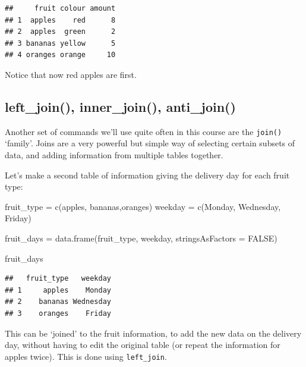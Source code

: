 \documentclass[
]{book}
\newenvironment{Shaded}{\begin{snugshade}}{\end{snugshade}}
\newcommand{\AttributeTok}[1]{\textcolor[rgb]{0.77,0.63,0.00}{#1}}
\newcommand{\ConstantTok}[1]{\textcolor[rgb]{0.00,0.00,0.00}{#1}}
\newcommand{\FunctionTok}[1]{\textcolor[rgb]{0.00,0.00,0.00}{#1}}
\newcommand{\NormalTok}[1]{#1}
\newcommand{\OtherTok}[1]{\textcolor[rgb]{0.56,0.35,0.01}{#1}}
\newcommand{\StringTok}[1]{\textcolor[rgb]{0.31,0.60,0.02}{#1}}
\begin{document}
\begin{verbatim}
##     fruit colour amount
## 1  apples    red      8
## 2  apples  green      2
## 3 bananas yellow      5
## 4 oranges orange     10
\end{verbatim}

Notice that now red apples are first.

\hypertarget{left_join-inner_join-anti_join}{%
\subsection{left\_join(), inner\_join(), anti\_join()}\label{left_join-inner_join-anti_join}}

Another set of commands we'll use quite often in this course are the \texttt{join()} `family'. Joins are a very powerful but simple way of selecting certain subsets of data, and adding information from multiple tables together.

Let's make a second table of information giving the delivery day for each fruit type:

\begin{Shaded}
\begin{Highlighting}[]
\NormalTok{fruit\_type }\OtherTok{=} \FunctionTok{c}\NormalTok{(}\StringTok{\textquotesingle{}apples\textquotesingle{}}\NormalTok{, }\StringTok{\textquotesingle{}bananas\textquotesingle{}}\NormalTok{,}\StringTok{\textquotesingle{}oranges\textquotesingle{}}\NormalTok{)}
\NormalTok{weekday }\OtherTok{=} \FunctionTok{c}\NormalTok{(}\StringTok{\textquotesingle{}Monday\textquotesingle{}}\NormalTok{, }\StringTok{\textquotesingle{}Wednesday\textquotesingle{}}\NormalTok{, }\StringTok{\textquotesingle{}Friday\textquotesingle{}}\NormalTok{)}

\NormalTok{fruit\_days }\OtherTok{=} \FunctionTok{data.frame}\NormalTok{(fruit\_type, weekday, }\AttributeTok{stringsAsFactors =} \ConstantTok{FALSE}\NormalTok{)}

\NormalTok{fruit\_days}
\end{Highlighting}
\end{Shaded}

\begin{verbatim}
##   fruit_type   weekday
## 1     apples    Monday
## 2    bananas Wednesday
## 3    oranges    Friday
\end{verbatim}

This can be `joined' to the fruit information, to add the new data on the delivery day, without having to edit the original table (or repeat the information for apples twice). This is done using \texttt{left\_join}.
\end{document}
